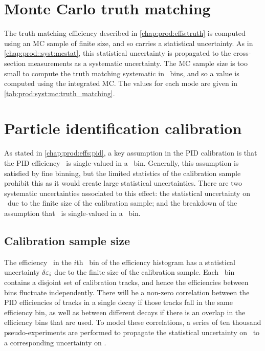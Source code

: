 \section{Monte Carlo truth matching}
\label{chap:prod:syst:mc:truth_matching}

The truth matching efficiency described in \cref{chap:prod:effs:truth} is computed using an \ac{MC} 
sample of finite size, and so carries a statistical uncertainty.
As in \cref{chap:prod::syst:mcstat}, this statistical uncertainty is propagated to the cross-section 
measurements as a systematic uncertainty.
The \ac{MC} sample size is too small to compute the truth matching systematic 
in \pTy\ bins, and so a value is computed using the integrated \ac{MC}.
The values for each mode are given in \cref{tab:prod:syst:mc:truth_matching}.

\section{Particle identification calibration}
\label{chap:prod:syst:pid}

As stated in \cref{chap:prod:effs:pid}, a key assumption in the \ac{PID} 
calibration is that the \ac{PID} efficiency \effpid\ is single-valued in a 
\ptotetanspd\ bin.
Generally, this assumption is satisfied by fine binning, but the limited 
statistics of the calibration sample prohibit this as it would create large 
statistical uncertainties.
There are two systematic uncertainties associated to this effect: the 
statistical uncertainty on \effpid\ due to the finite size of the calibration 
sample; and the breakdown of the assumption that \effpid\ is single-valued in a 
\ptotetanspd\ bin.

\subsection{Calibration sample size}
\label{chap:prod:syst:pid:stat}

The efficiency \effi\ in the $i$th \ptotetanspd\ bin of the efficiency 
histogram has a statistical uncertainty $\delta{\ensuremath{\varepsilon_{i}}}$ due to the finite size of 
the calibration sample.
Each \ptotetanspd\ bin contains a disjoint set of calibration tracks, and hence 
the efficiencies between bins fluctuate independently.
There will be a non-zero correlation between the \ac{PID} efficiencies of 
tracks in a single decay if those tracks fall in the same efficiency bin, as 
well as between different decays if there is an overlap in the efficiency bins 
that are used.
To model these correlations, a series of ten thousand pseudo-experiments are 
performed to propagate the statistical uncertainty on \effi\ to a corresponding 
uncertainty on \effpid.

